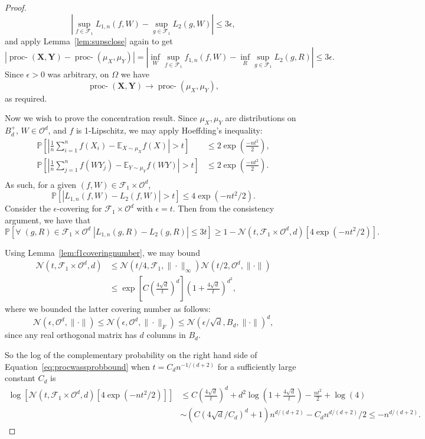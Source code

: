 \documentclass[12pt]{article}
\newcommand{\EE}{\mathbb{E}}
\newcommand{\PP}{\mathbb{P}}
\theoremstyle{definition}
\newcommand{\bX}{\mathbf{X}}
\newcommand{\bY}{\mathbf{Y}}
\newcommand{\procwp}[1][2]{\mathop{\mbox{proc-$W_#1$}}}
\newcommand{\procwphat}[1][2]{\mathop{\mbox{proc-$\hat{W}_#1$}}}
\begin{document}
\begin{proof}
$$ \left|\sup_{f\in\mathcal{F}_1}L_{1,n}(f,W)-\sup_{g\in\mathcal{F}_1}L_2(g,W)\right|\leq 3\epsilon,$$ and apply Lemma~\ref{lem:supsclose} again to get
$$|\procwphat[1](\bX,\bY)-\procwp[1](\mu_X,\mu_Y)|=\left|\inf_W \sup_{f\in \mathcal{F}_1} f_{1,n}(f,W) - \inf_R \sup_{g\in\mathcal{F}_1} L_2(g,R)\right|\leq 3\epsilon. $$ Since $\epsilon>0$ was arbitrary, on $\Omega$ we have $$\procwphat[1](\bX,\bY)\rightarrow \procwp[1](\mu_X,\mu_Y),$$
as required.

Now we wish to prove the concentration result. Since $\mu_X, \mu_Y$ are distributions on $B_d^+$, $W\in\mathcal{O}^d$, and $f$ is 1-Lipschitz, we may apply Hoeffding's inequality:
\begin{align*}
\PP\left[\left|\frac{1}{n}\sum_{i=1}^n f(X_i) - \EE_{X\sim\mu_X} f(X)\right|>t\right]&\leq 2\exp\left(\frac{-nt^2}{2}\right),\\
\PP\left[\left|\frac{1}{n}\sum_{j=1}^n f(WY_j) - \EE_{Y\sim\mu_Y} f(WY)\right|>t\right]&\leq 2\exp\left(\frac{-nt^2}{2}\right).\\
\end{align*}
As such, for a given $(f,W)\in\mathcal{F}_1\times \mathcal{O}^d$, 
$$ \PP[|L_{1,n}(f,W)-L_2(f,W)|>t]\leq 4\exp(-nt^2/2).$$ Consider the $\epsilon$-covering for $\mathcal{F}_1\times \mathcal{O}^d$ with $\epsilon=t$. Then from the consistency argument, we have that
\begin{equation}
\label{eq:procwassprobbound}
\PP\left[\forall\;(g,R)\in\mathcal{F}_1\times\mathcal{O}^d\; |L_{1,n}(g,R)-L_2(g,R)|\leq 3t\right]\geq 1- \mathcal{N}(t,\mathcal{F}_1\times\mathcal{O}^d,d)[4\exp(-nt^2/2)].\end{equation}

Using Lemma~\ref{lem:f1coveringnumber}, we may bound 
\begin{align*}
\mathcal{N}(t,\mathcal{F}_1\times\mathcal{O}^d,d) &\leq \mathcal{N}(t/4,\mathcal{F}_1,\|\cdot\|_{\infty})\mathcal{N}(t/2,\mathcal{O}^d,\|\cdot\|)\\
&\leq \exp\left[C\left(\frac{4\sqrt{d}}{t}\right)^d\right] \left(1+\frac{4\sqrt{d}}{t}\right)^{d^2},
\end{align*}
where we bounded the latter covering number as follows:
$$ \mathcal{N}(\epsilon,\mathcal{O}^d,\|\cdot\|)\leq \mathcal{N}(\epsilon,\mathcal{O}^d,\|\cdot\|_F)\leq \mathcal{N}(\epsilon/\sqrt{d},B_d,\|\cdot\|)^d,$$ since any real orthogonal matrix has $d$ columns in $B_d$.

So the log of the complementary probability on the right hand side of Equation~\ref{eq:procwassprobbound} when $t=C_d n^{-1/(d+2)}$ for a sufficiently large constant $C_d$ is  
\begin{align*}
\log\left[\mathcal{N}(t,\mathcal{F}_1\times\mathcal{O}^d,d)[4\exp(-nt^2/2)]\right] &\leq C\left(\frac{4\sqrt{d}}{t}\right)^d + d^2\log\left(1+\frac{4\sqrt{d}}{t}\right)-\frac{nt^2}{2}+\log(4)\\
&\sim (C(4\sqrt{d}/C_d)^d+1) n^{d/(d+2)} - C_d n^{d/(d+2)}/2\leq -n^{d/(d+2)}.
\end{align*}


\end{proof}
\end{document}
